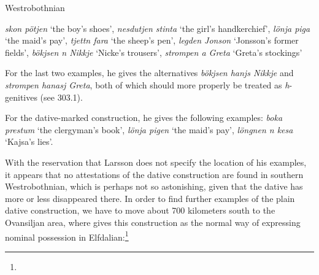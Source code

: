
\begin{listWWNumileveli}
\item 

\begin{styleExample}
Westrobothnian

\end{styleExample}

\end{listWWNumileveli}

\begin{styleBlockQuote}
\textit{skon pötjen} ‘the boy’s shoes’, \textit{nesdutjen stinta} ‘the girl’s handkerchief’, \textit{lönja piga} ‘the maid’s pay’, \textit{tjettn fara} ‘the sheep’s pen’, \textit{legden Jonson} ‘Jonsson’s former fields’, \textit{bökjsen n Nikkje} ‘Nicke’s trousers’, \textit{strompen a Greta} ‘Greta’s stockings’

\end{styleBlockQuote}

\begin{styleBodyTextFirst}
For the last two examples, he gives the alternatives \textit{bökjsen hanjs Nikkje} and \textit{strompen hanasj Greta}, both of which should more properly be treated as \textit{h}{}-genitives (see 303.1).

\end{styleBodyTextFirst}

\begin{styleBodytextC}
For the dative-marked construction, he gives the following examples: \textit{boka prestum} ‘the clergyman’s book’, \textit{lönja pigen} ‘the maid’s pay’,\textit{ löngnen n kesa} ‘Kajsa’s lies’. 

\end{styleBodytextC}

\begin{styleBodytextC}
With the reservation that Larsson does not specify the location of his examples, it appears that no attestations of the dative construction are found in southern Westrobothnian, which is perhaps not so astonishing, given that the dative has more or less disappeared there. In order to find further examples of the plain dative construction, we have to move about 700 kilometers south to the Ovansiljan area, where \citet[97]{Levander1909} gives this construction as the normal way of expressing nominal possession in Elfdalian:\footnote{}

\end{styleBodytextC}

